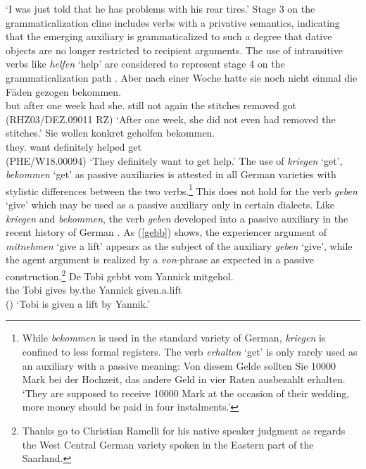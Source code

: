 \documentclass[output=paper
                ,modfonts
                ,nonflat
	        ,collection
	        ,collectionchapter
	        ,collectiontoclongg
 	        ,biblatex
                ,babelshorthands
                ,newtxmath
                ,draftmode
                ,colorlinks, citecolor=brown
]{./langsci/langscibook}
\begin{document}
\glt `I was just told that he has problems with his rear tires.'
\z
Stage 3 on the grammaticalization cline includes verbs with a privative semantics, indicating that the emerging auxiliary is grammaticalized to such a degree that dative objects are no longer restricted to recipient arguments. The use of intransitive verbs like \textit{helfen} `help' are considered to represent stage 4 on the grammaticalization path \citep[64]{ebert78}.
\eal \label{intrans}
\ex
\gll Aber nach einer Woche hatte sie noch nicht einmal die Fäden gezogen bekommen.  \\ but after one week had she.\nom {} still not again the stitches removed got \\ \hfill (RHZ03/DEZ.09011 RZ)
\glt `After one week, she did not even had removed the stitches.'
\ex
\gll  Sie wollen konkret geholfen bekommen.  \\ they.\nom {} want definitely helped get  \\ \hfill  (PHE/W18.00094)
\glt `They definitely want to get help.'
\zl
The use of \textit{kriegen} `get', \textit{bekommen} `get' as passive auxiliaries is attested in all German varieties with stylistic differences between the two verbs.\footnote{While \textit{bekommen} is used in the standard variety of German, \textit{kriegen} is confined to less formal registers. The verb \textit{erhalten} `get' is only rarely used as an auxiliary with a passive meaning:
\vspace{-0.2cm}
\ea Von diesem Gelde sollten Sie 10000 Mark bei der Hochzeit, das andere Geld in vier Raten ausbezahlt erhalten.
\glt `They are supposed to receive 10000 Mark at the occasion of their wedding, more money should be paid in four instalments.'
\z
\vspace{-0.2cm}
} 
This does not hold for the verb \textit{geben} `give' which may be used as a passive auxiliary only in certain dialects. Like \textit{kriegen} and \textit{bekommen}, the verb \textit{geben} developed into a passive auxiliary in the recent history of German \citep{lenz2007}. As (\ref{gebb}) shows, the experiencer argument of \textit{mitnehmen} `give a lift' appears as the subject of the auxiliary \textit{geben} `give', while the agent argument is realized by a \textit{von}-phrase as expected in a passive construction.\footnote{Thanks go to Christian Ramelli for his native speaker judgment as regards the West Central German variety spoken in the Eastern part of the Saarland.}
\ea \label{gebb}
\gll De Tobi gebbt vom Yannick mitgehol. \\
the Tobi gives by.the Yannick given.a.lift   \\ \hfill ()
\glt `Tobi is given a lift by Yannik.'
\z
\end{document}
